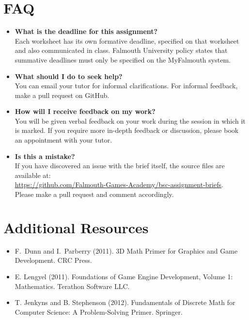 \documentclass{../../fal_assignment}
\begin{document}
\section*{FAQ}

\begin{itemize}
	\item 	\textbf{What is the deadline for this assignment?} \\ 
			Each worksheet has its own formative deadline, specified on that worksheet and also communicated in class.
    		Falmouth University policy states that summative deadlines must only be specified on the MyFalmouth system.
    		
	\item 	\textbf{What should I do to seek help?} \\ 
    		You can email your tutor for informal clarifications. For informal feedback, make a pull request on GitHub. 
    		
	\item 	\textbf{How will I receive feedback on my work?} \\ 
    		You will be given verbal feedback on your work during the session in which it is marked.
    		If you require more in-depth feedback or discussion, please book an appointment with your tutor.
    		
    	\item 	\textbf{Is this a mistake?} \\ 	
    		If you have discovered an issue with the brief itself, the source files are available at: \\
    		\url{https://github.com/Falmouth-Games-Academy/bsc-assignment-briefs}.\\
    		 Please make a pull request and comment accordingly.
\end{itemize}

\section*{Additional Resources}

\begin{itemize}
    \item F.\ Dunn and I.\ Parberry (2011). 3D Math Primer for Graphics and Game Development. CRC Press.
    \item E. Lengyel (2011). Foundations of Game Engine Development, Volume 1: Mathematics. Terathon Software LLC.
    \item T. Jenkyns and B. Stephenson (2012). Fundamentals of Discrete Math for Computer Science: A Problem-Solving Primer. Springer.
\end{itemize}
\end{document}
